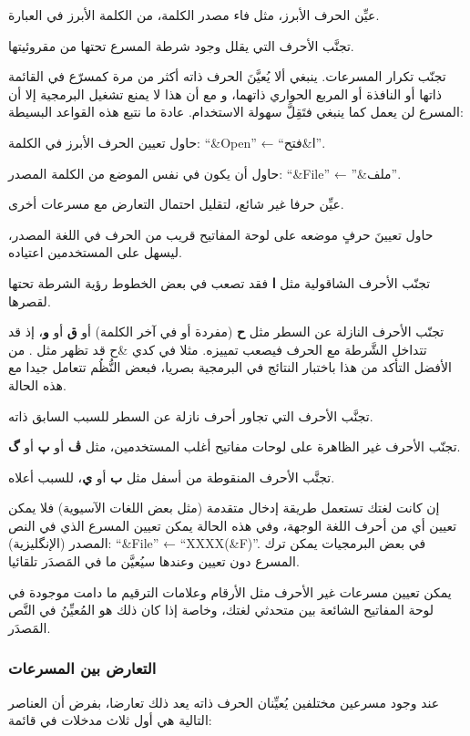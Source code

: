 \startitemize[n]
\item عيِّن الحرف الأبرز، مثل فاء مصدر الكلمة، من الكلمة الأبرز في
العبارة.
\item تجنَّب الأحرف التي يقلل وجود شرطة المسرع تحتها من مقروئيتها.
\item تجنّب تكرار المسرعات. ينبغي ألا يُعيَّنَ الحرف ذاته أكثر من مرة
كمسرّع في القائمة ذاتها أو النافذة أو المربع الحواري ذاتهما، و مع أن
هذا لا يمنع تشغيل البرمجية إلا أن المسرع لن يعمل كما ينبغي فتَقِلَّ
سهولة الاستخدام.
\stopitemize
عادة ما نتبع هذه القواعد البسيطة:

\startitemize[n]
\item حاول تعيين الحرف الأبرز في الكلمة: ‪“\&Open”‬ ← “ا\&فتح”.
\item حاول أن يكون في نفس الموضع من الكلمة المصدر: ‪“\&File”‬ ← ”\&ملف”.
\item عيِّن حرفا غير شائع، لتقليل احتمال التعارض مع مسرعات أخرى.
\item حاول تعيينَ حرفٍ موضعه على لوحة المفاتيح قريب من الحرف في اللغة
المصدر، ليسهل على المستخدمين اعتياده.
\item تجنّب الأحرف الشاقولية مثل {\bf ا} فقد تصعب في بعض الخطوط رؤية
الشرطة تحتها لقصرها.
\item تجنّب الأحرف النازلة عن السطر مثل {\bf ح} (مفردة أو في آخر الكلمة)
أو {\bf ق} أو {\bf و}، إذ قد تتداخل الشَّرطة مع الحرف فيصعب تمييزه.
مثلا في كدي \&ح قد تظهر مثل . من الأفضل التأكد من هذا
باختبار النتائج في البرمجية بصريا، فبعض النُّظُم تتعامل جيدا مع هذه
الحالة.
\item تجنَّب الأحرف التي تجاور أحرف نازلة عن السطر للسبب السابق ذاته.
\item تجنّب الأحرف غير الظاهرة على لوحات مفاتيح أغلب المستخدمين، مثل
{\bf ڤ} أو {\bf پ} أو {\bf گ}.
\item تجنَّب الأحرف المنقوطة من أسفل مثل {\bf ب} أو {\bf ي}، للسبب
أعلاه.
\item إن كانت لغتك تستعمل طريقة إدخال متقدمة (مثل بعض اللغات الآسيوية)
فلا يمكن تعيين أي من أحرف اللغة الوجهة، وفي هذه الحالة يمكن تعيين
المسرع الذي في النص المصدر (الإنگليزية): ‪“\&File”‬ ←‏ ‪“XXXX(\&F)”‬.
في بعض البرمجيات يمكن ترك المسرع دون تعيين وعندها سيُعيَّن ما في
المَصدَر تلقائيا.
\item يمكن تعيين مسرعات غير الأحرف مثل الأرقام وعلامات الترقيم ما دامت
موجودة في لوحة المفاتيح الشائعة بين متحدثي لغتك، وخاصة إذا كان ذلك هو
المُعيِّنُ في النَّص المَصدَر.
\stopitemize
\subsubsection{التعارض بين المسرعات}
عند وجود مسرعين مختلفين يُعيِّنان الحرف ذاته يعد ذلك تعارضا، بفرض أن
العناصر التالية هي أول ثلاث مدخلات في قائمة:

